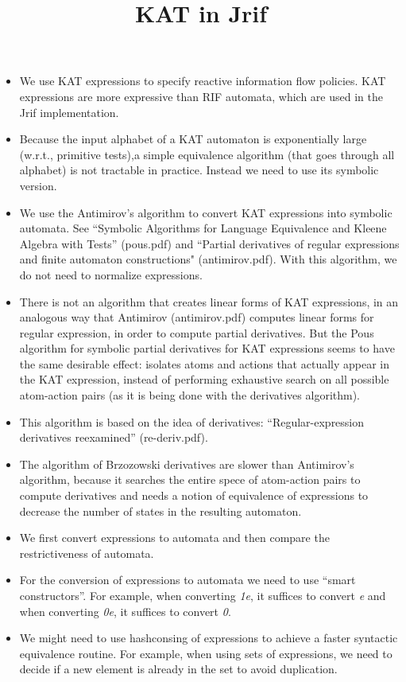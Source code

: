 \documentclass[10pt]{article}
\title{KAT in Jrif}
\begin{document}
\maketitle
\begin{itemize}
\item We use KAT expressions to specify reactive information flow policies. KAT expressions are more expressive than RIF automata, which are used in the Jrif implementation.
\item Because the input alphabet of a KAT automaton is exponentially large (w.r.t., primitive tests),a simple equivalence algorithm (that goes through all alphabet) is not tractable in practice. Instead we need to use its symbolic version.
\item We use the Antimirov's algorithm to convert KAT expressions into symbolic automata. See ``Symbolic Algorithms for Language Equivalence and Kleene Algebra with Tests'' (pous.pdf) and ``Partial derivatives of regular expressions and finite automaton constructions" (antimirov.pdf). With this algorithm, we do not need to normalize expressions.
\item There is not an algorithm that creates linear forms of KAT expressions, in an analogous way that Antimirov (antimirov.pdf) computes linear forms for regular expression, in order to compute partial derivatives. But the Pous algorithm for symbolic partial derivatives for KAT expressions seems to have the same desirable effect: isolates atoms and actions that actually appear in the KAT expression, instead of performing exhaustive search on all possible atom-action pairs (as it is being done with the derivatives algorithm).
\item This algorithm is based on the idea of derivatives: ``Regular-expression derivatives reexamined'' (re-deriv.pdf).
\item  The algorithm of Brzozowski derivatives are slower than Antimirov's algorithm, because it searches the entire spece of atom-action pairs to compute derivatives and needs a notion of equivalence of expressions to decrease the number of states in the resulting automaton.
\item We first convert expressions to automata and then compare the restrictiveness of automata.
\item For the conversion of expressions to automata we need to use ``smart constructors''. For example, when converting \emph{1e}, it suffices to convert \emph{e} and when converting \emph{0e}, it suffices to convert \emph{0}.
\item We might need to use hashconsing of expressions to achieve a faster syntactic equivalence routine. For example, when using sets of expressions, we need to decide if a new element is already in the set to avoid duplication.

\end{itemize}
\end{document}
